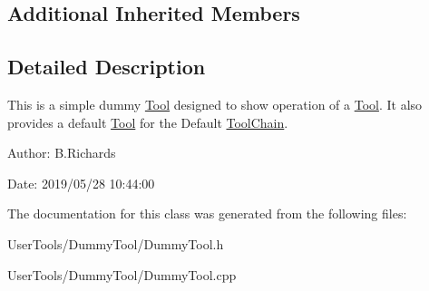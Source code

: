 \subsection*{Additional Inherited Members}


\subsection{Detailed Description}
This is a simple dummy \hyperlink{classTool}{Tool} designed to show operation of a \hyperlink{classTool}{Tool}. It also provides a default \hyperlink{classTool}{Tool} for the Default \hyperlink{classToolChain}{Tool\-Chain}.

\begin{DoxyParagraph}{Author\-:}
B.\-Richards 
\end{DoxyParagraph}
\begin{DoxyParagraph}{Date\-:}
2019/05/28 10\-:44\-:00 
\end{DoxyParagraph}


The documentation for this class was generated from the following files\-:\begin{DoxyCompactItemize}
\item 
User\-Tools/\-Dummy\-Tool/Dummy\-Tool.\-h\item 
User\-Tools/\-Dummy\-Tool/Dummy\-Tool.\-cpp\end{DoxyCompactItemize}
